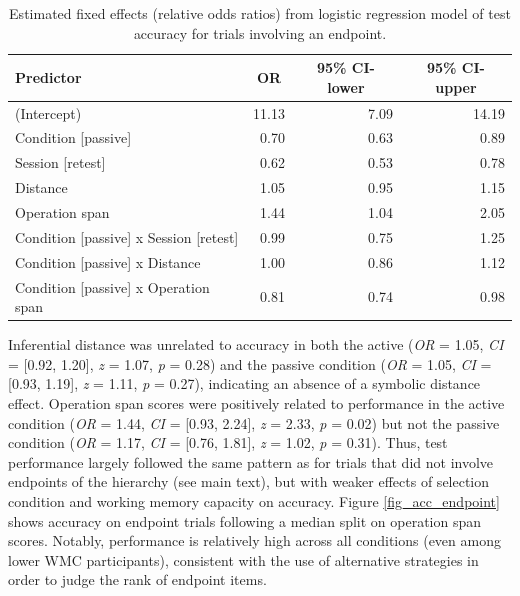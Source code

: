 \documentclass[floatsintext,man]{apa6}
\theoremstyle{definition}
\theoremstyle{definition}
\theoremstyle{definition}
\theoremstyle{remark}
\begin{document}
\begin{table}[tbp]
\begin{center}
\begin{threeparttable}
\caption{\label{tab:accuracy_endpoint}Estimated fixed effects (relative odds ratios) from logistic regression model of test accuracy for trials involving an endpoint.}
\small{
\begin{tabular}{lrrr}
\toprule
Predictor & \multicolumn{1}{c}{OR} & \multicolumn{1}{c}{95\% CI-lower} & \multicolumn{1}{c}{95\% CI-upper}\\
\midrule
(Intercept) & 11.13 & 7.09 & 14.19\\
Condition [passive] & 0.70 & 0.63 & 0.89\\
Session [retest] & 0.62 & 0.53 & 0.78\\
Distance & 1.05 & 0.95 & 1.15\\
Operation span & 1.44 & 1.04 & 2.05\\
Condition [passive] x Session [retest] & 0.99 & 0.75 & 1.25\\
Condition [passive] x Distance & 1.00 & 0.86 & 1.12\\
Condition [passive] x Operation span & 0.81 & 0.74 & 0.98\\
\bottomrule
\end{tabular}
}
\end{threeparttable}
\end{center}
\end{table}

Inferential distance was unrelated to accuracy in both the active
(\emph{OR} = 1.05, \emph{CI} = {[}0.92, 1.20{]}, \emph{z} = 1.07,
\emph{p} = 0.28) and the passive condition (\emph{OR} = 1.05, \emph{CI}
= {[}0.93, 1.19{]}, \emph{z} = 1.11, \emph{p} = 0.27), indicating an
absence of a symbolic distance effect. Operation span scores were
positively related to performance in the active condition (\emph{OR} =
1.44, \emph{CI} = {[}0.93, 2.24{]}, \emph{z} = 2.33, \emph{p} = 0.02)
but not the passive condition (\emph{OR} = 1.17, \emph{CI} = {[}0.76,
1.81{]}, \emph{z} = 1.02, \emph{p} = 0.31). Thus, test performance
largely followed the same pattern as for trials that did not involve
endpoints of the hierarchy (see main text), but with weaker effects of
selection condition and working memory capacity on accuracy. Figure
\ref{fig_acc_endpoint} shows accuracy on endpoint trials following a
median split on operation span scores. Notably, performance is
relatively high across all conditions (even among lower WMC
participants), consistent with the use of alternative strategies in
order to judge the rank of endpoint items.
\end{document}
